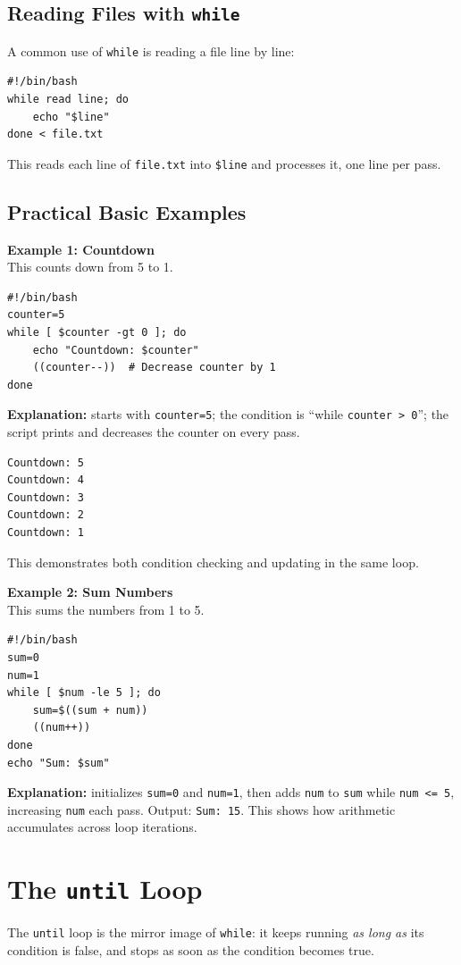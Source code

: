 \subsection{Reading Files with \texttt{while}}
A common use of \texttt{while} is reading a file line by line:
\begin{lstlisting}[language=Terminal]
#!/bin/bash
while read line; do
    echo "$line"
done < file.txt
\end{lstlisting}
This reads each line of \texttt{file.txt} into \texttt{\$line} and processes it, one line per pass.

\subsection{Practical Basic Examples}

\textbf{Example 1: Countdown}\\
This counts down from 5 to 1.
\begin{lstlisting}[language=Terminal]
#!/bin/bash
counter=5
while [ $counter -gt 0 ]; do
    echo "Countdown: $counter"
    ((counter--))  # Decrease counter by 1
done
\end{lstlisting}
\textbf{Explanation:} starts with \texttt{counter=5}; the condition is ``while \texttt{counter > 0}''; the script prints and decreases the counter on every pass.
\begin{lstlisting}[language=Terminal]
Countdown: 5
Countdown: 4
Countdown: 3
Countdown: 2
Countdown: 1
\end{lstlisting}
This demonstrates both condition checking and updating in the same loop.

\textbf{Example 2: Sum Numbers}\\
This sums the numbers from 1 to 5.
\begin{lstlisting}[language=Terminal]
#!/bin/bash
sum=0
num=1
while [ $num -le 5 ]; do
    sum=$((sum + num))
    ((num++))
done
echo "Sum: $sum"
\end{lstlisting}
\textbf{Explanation:} initializes \texttt{sum=0} and \texttt{num=1}, then adds \texttt{num} to \texttt{sum} while \texttt{num <= 5}, increasing \texttt{num} each pass. Output: \texttt{Sum: 15}. This shows how arithmetic accumulates across loop iterations.

\section{The \texttt{until} Loop}
The \texttt{until} loop is the mirror image of \texttt{while}: it keeps running \emph{as long as} its condition is false, and stops as soon as the condition becomes true.

